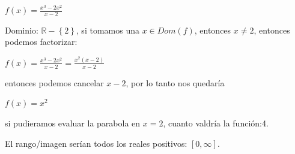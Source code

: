 \documentclass[aspectratio=169,10pt]{beamer}
\begin{document}
\begin{frame}
$f(x)=\frac{x^3-2x^{2}}{x-2}$

Dominio: $\mathbb{R}-\left\{2\right\}$, si tomamos una $x\in Dom(f)$, entonces $x\neq2$, entonces podemos factorizar:
\begin{center}
$f(x)=\frac{x^3-2x^{2}}{x-2}=\frac{x^2(x-2)}{x-2}$
\end{center}
entonces podemos cancelar $x-2$, por lo tanto nos quedaría
\begin{center}
$f(x)=x^2$
\end{center}
si pudieramos evaluar la parabola en $x=2$, cuanto valdría la función:4.

El rango/imagen serían todos los reales positivos: $[0,\infty]$.

\end{frame}
\end{document}
